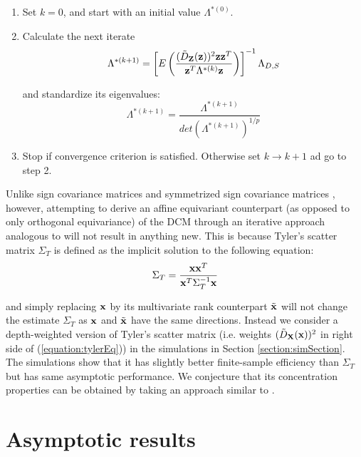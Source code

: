 \documentclass[fleqn,12pt]{article}
\begin{document}
\begin{enumerate}
\item Set $k=0$, and start with an initial value $\Lambda^{*(0)}$.

\item Calculate the next iterate
$$ \Lambda^{*(k+1)} = \left[ E\left( \frac{(\tilde D_{\mathbf{Z}}({\bf{z}}))^2 {\bf{z}} {\bf{z}}^T}{{\bf{z}}^T \Lambda^{*(k)} {\bf{z}}} \right) \right]^{-1} \Lambda_{D,S} $$

and standardize its eigenvalues:
$$ \Lambda^{*(k+1)} = \frac{\Lambda^{*(k+1)}}{det(\Lambda^{*(k+1)})^{1/p}} $$

\item Stop if convergence criterion is satisfied. Otherwise set $k \rightarrow k+1$ ad go to step 2.
\end{enumerate}

Unlike sign covariance matrices and symmetrized sign covariance matrices \citep{dumbgen98}, however, attempting to derive an affine equivariant counterpart (as opposed to only orthogonal equivariance) of the DCM through an iterative approach analogous to \cite{tyler87} will not result in anything new. This is because Tyler's scatter matrix $\Sigma_T$ is defined as the implicit solution to the following equation:
\begin{equation} \label{equation:tylerEq}
\Sigma_T = \frac{{\bf{x}} {\bf{x}}^T}{{\bf{x}}^T \Sigma_T^{-1} {\bf{x}}}
\end{equation}

and simply replacing ${\bf{x}}$ by its multivariate rank counterpart $\tilde{{\bf{x}}}$ will not change the estimate $\Sigma_T$ as ${\bf{x}}$ and $\tilde {{\bf{x}}}$ have the same directions. Instead we consider a depth-weighted version of Tyler's scatter matrix (i.e. weights $(\tilde D_{\mathbf{X}}({\bf{x}}))^2$ in right side of (\ref{equation:tylerEq})) in the simulations in Section \ref{section:simSection}. The simulations show that it has slightly better finite-sample efficiency than $\Sigma_T$ but has same asymptotic performance. We conjecture that its concentration properties can be obtained by taking an approach similar to \cite{soloveychik14}.

\section{Asymptotic results}
\end{document}
